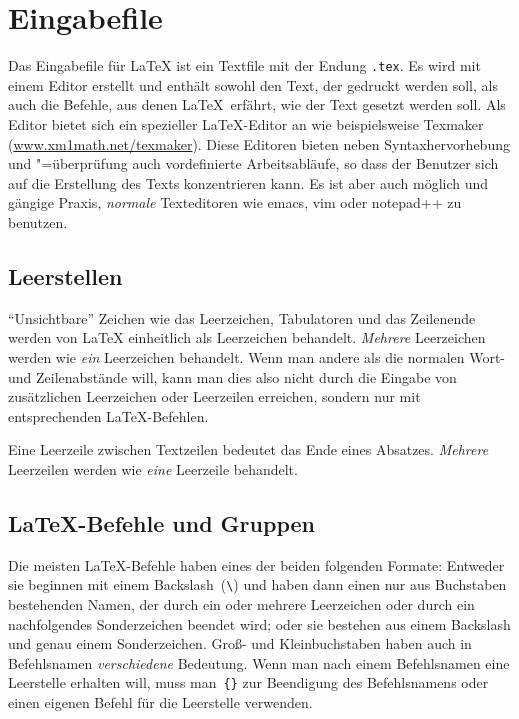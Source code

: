 

\section{Eingabefile}

Das Eingabefile für \LaTeX{} ist ein Textfile mit der Endung \lstinline+.tex+.
Es  wird mit einem Editor erstellt und enthält sowohl den Text, der gedruckt
werden  soll, als auch die Befehle, aus denen \LaTeX\ erfährt, wie der Text
gesetzt  werden soll. Als Editor bietet sich ein spezieller \LaTeX-Editor an
wie beispielsweise Texmaker (\href{http://www.xm1math.net/texmaker}{www.xm1math.net/texmaker}). Diese Editoren bieten neben Syntaxhervorhebung
und "=überprüfung auch vordefinierte Arbeitsabläufe, so dass der Benutzer sich
auf die Erstellung des Texts konzentrieren kann. Es ist aber auch möglich und
gängige Praxis, \emph{normale} Texteditoren wie emacs, vim oder notepad++ zu
benutzen.


\subsection{Leerstellen}
 
"`Unsichtbare"' Zeichen wie das Leerzeichen, Tabulatoren und das Zeilenende 
werden von \LaTeX{} einheitlich als Leerzeichen behandelt. \emph{Mehrere}
Leerzeichen werden wie \emph{ein} Leerzeichen behandelt. Wenn man andere als 
die normalen Wort- und Zeilenabstände will, kann man dies also nicht durch die 
Eingabe von zusätzlichen Leerzeichen oder Leerzeilen erreichen, sondern nur mit 
entsprechenden \LaTeX-Befehlen.

Eine Leerzeile zwischen Textzeilen bedeutet das Ende eines Absatzes.
\emph{Mehrere} Leerzeilen werden wie \emph{eine} Leerzeile behandelt.
 
 
\subsection{\LaTeX-Befehle und Gruppen}
 
Die meisten \LaTeX-Befehle haben eines der beiden folgenden Formate: Entweder
sie beginnen mit einem Backslash~(\lstinline|\|) und haben dann einen nur aus
Buchstaben bestehenden Namen, der durch ein oder mehrere Leerzeichen oder
durch ein nachfolgendes Sonderzeichen beendet wird; oder sie bestehen aus
einem Backslash und genau einem Sonderzeichen. Groß- und Kleinbuchstaben haben
auch in Befehlsnamen \emph{verschiedene}  Bedeutung. Wenn man nach einem
Befehlsnamen eine Leerstelle erhalten will, muss  man~\lstinline|{}| zur
Beendigung des Befehlsnamens oder einen eigenen Befehl für die Leerstelle
verwenden.

